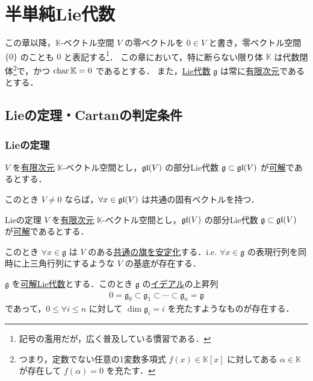 \documentclass[rep_main]{subfiles}
\begin{document}
\setcounter{chapter}{1}

\chapter{半単純Lie代数}

この章以降，$\mathbb{K}$-ベクトル空間 $V$ の零ベクトルを $0 \in V$ と書き，零ベクトル空間 $\{0\}$ のことも $0$ と表記する\footnote{記号の濫用だが，広く普及している慣習である．}．
この章において，特に断らない限り体 $\mathbb{K}$ は代数閉体\footnote{つまり，定数でない任意の1変数多項式 $f(x) \in \mathbb{K}[x]$ に対してある $\alpha \in \mathbb{K}$ が存在して $f(\alpha) = 0$ を充たす．}で，かつ $\operatorname{char} \mathbb{K} = 0$ であるとする．
また，\hyperref[ax:LieAlg]{Lie代数} $\mathfrak{g}$ は常に\underline{有限次元}であるとする．
\section{Lieの定理・Cartanの判定条件}

\subsection{Lieの定理}

\begin{mytheo}[label=thm:eigen-Lie]{}
	$V$ を\underline{有限次元} $\mathbb{K}$-ベクトル空間とし，$\mathfrak{gl} (V)$ の部分Lie代数 $\mathfrak{g} \subset \mathfrak{gl} (V)$ が\hyperref[def:solvable-LieAlg]{可解}であるとする．

	このとき $V \neq 0$ ならば，$\forall x \in \mathfrak{gl} (V)$ は共通の固有ベクトルを持つ．
\end{mytheo}

\begin{mycol}[label=thm:Lie]{Lieの定理}
	$V$ を\underline{有限次元} $\mathbb{K}$-ベクトル空間とし，$\mathfrak{gl} (V)$ の部分Lie代数 $\mathfrak{g} \subset \mathfrak{gl} (V)$ が\hyperref[def:solvable-LieAlg]{可解}であるとする．

	このとき $\forall x \in \mathfrak{g}$ は $V$ のある\underline{共通の}\hyperref[def:flag]{旗を安定化}する．i.e. $\forall x \in \mathfrak{g}$ の表現行列を同時に上三角行列にするような $V$ の基底が存在する．
\end{mycol}

\begin{mycol}[label=col:Lie-1]{}
	$\mathfrak{g}$ を\hyperref[def:solvable-LieAlg]{可解Lie代数}とする．このとき $\mathfrak{g}$ の\hyperref[def:ideal-LieAlg]{イデアル}の上昇列
	\begin{align}
		0 = \mathfrak{g}_0 \subset \mathfrak{g}_1 \subset \cdots \subset \mathfrak{g}_n = \mathfrak{g}
	\end{align}
	であって，$0 \le \forall i \le n$ に対して $\dim \mathfrak{g}_i = i$ を充たすようなものが存在する．
\end{mycol}
\end{document}
